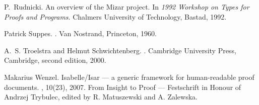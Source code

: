 \documentclass{llncs}
\begin{document}
\begin{thebibliography}{10}
P.~Rudnicki.
\newblock An overview of the Mizar project.
\newblock In {\em 1992 Workshop on Types for Proofs and Programs}. Chalmers
  University of Technology, Bastad, 1992.

Patrick Suppes.
.
\newblock Van Nostrand, Princeton, 1960.

A.~S. Troelstra and Helmut Schwichtenberg.
.
\newblock Cambridge University Press, Cambridge, second edition, 2000.

Makarius Wenzel.
\newblock Isabelle/Isar --- a generic framework for human-readable proof
  documents.
, 10(23), 2007.
\newblock From Insight to Proof --- Festschrift in Honour of Andrzej Trybulec,
  edited by R. Matuszewski and A. Zalewska.

\end{thebibliography}
\end{document}
